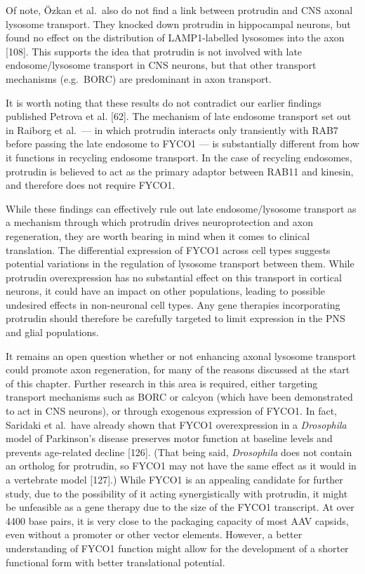 \documentclass[
  12pt,
  a4paper,
]{book}
\begin{document}
Of note, Özkan et al.~also do not find a link between protrudin and CNS axonal lysosome transport. They knocked down protrudin in hippocampal neurons, but found no effect on the distribution of LAMP1-labelled lysosomes into the axon {[}108{]}. This supports the idea that protrudin is not involved with late endosome/lysosome transport in CNS neurons, but that other transport mechanisms (e.g.~BORC) are predominant in axon transport.

It is worth noting that these results do not contradict our earlier findings published Petrova et al. {[}62{]}. The mechanism of late endosome transport set out in Raiborg et al.~--- in which protrudin interacts only transiently with RAB7 before passing the late endosome to FYCO1 --- is substantially different from how it functions in recycling endosome transport. In the case of recycling endosomes, protrudin is believed to act as the primary adaptor between RAB11 and kinesin, and therefore does not require FYCO1.

While these findings can effectively rule out late endosome/lysosome transport as a mechanism through which protrudin drives neuroprotection and axon regeneration, they are worth bearing in mind when it comes to clinical translation. The differential expression of FYCO1 across cell types suggests potential variations in the regulation of lysosome transport between them. While protrudin overexpression has no substantial effect on this transport in cortical neurons, it could have an impact on other populations, leading to possible undesired effects in non-neuronal cell types. Any gene therapies incorporating protrudin should therefore be carefully targeted to limit expression in the PNS and glial populations.

It remains an open question whether or not enhancing axonal lysosome transport could promote axon regeneration, for many of the reasons discussed at the start of this chapter. Further research in this area is required, either targeting transport mechanisms such as BORC or calcyon (which have been demonstrated to act in CNS neurons), or through exogenous expression of FYCO1. In fact, Saridaki et al.~have already shown that FYCO1 overexpression in a \emph{Drosophila} model of Parkinson's disease preserves motor function at baseline levels and prevents age-related decline {[}126{]}. (That being said, \emph{Drosophila} does not contain an ortholog for protrudin, so FYCO1 may not have the same effect as it would in a vertebrate model {[}127{]}.) While FYCO1 is an appealing candidate for further study, due to the possibility of it acting synergistically with protrudin, it might be unfeasible as a gene therapy due to the size of the FYCO1 transcript. At over 4400 base pairs, it is very close to the packaging capacity of most AAV capsids, even without a promoter or other vector elements. However, a better understanding of FYCO1 function might allow for the development of a shorter functional form with better translational potential.
\end{document}

